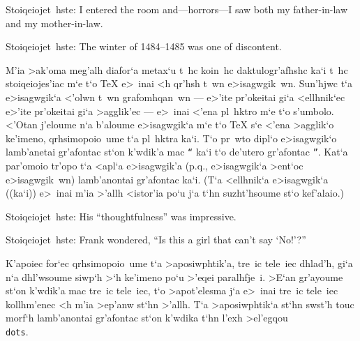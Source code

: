 
\exercise Stoiqeiojet~hste: {\rm I entered the room and---horrors---I
saw both my father-in-law and my mother-in-law. }

\exercise Stoiqeiojet~hste: {\rm The winter of 1484--1485 was one of
discontent. }
\bigskip

M'ia >ak'oma meg'alh diafor`a metax`u t~hc koin~hc daktulogr'afhshc ka`i
t~hc stoiqeiojes'iac m`e t`o {\rm \TeX} e>~inai <h qr'hsh t~wn
e>isa\-gw\-gik~wn.  Sun'hjwc t`a e>isagwgik`a <'olwn t~wn
grafo\-mh\-qa\-n~wn --- e>'ite pr'okeitai gi`a <ellhnik`ec e>'ite
pr'okeitai gi`a >agglik'ec --- e>~inai <'ena pl~hktro m`e t`o
s'umbolo\null.  <'Otan j'eloume n`a b'aloume e>isagwgik`a m`e
t`o {\rm \TeX} s`e <'ena >agglik`o ke'imeno, qrhsimopoio~ume t`a
pl~h\-ktra  ka`i\null.
T`o pr~wto dipl`o e>isagwgik`o lamb'anetai gr'afontac st`on k'wdik'a mac
{\tt ``} ka`i t`o de'utero gr'afontac {\tt ''}\null. Kat`a par'omoio   
tr'opo t`a <apl`a e>isagwgik'a (p.q., e>isagwgik`a >ent`oc
e>isa\-gw\-gi\-k~wn) lamb'anontai gr'a\-fontac ka`i\null.  (T`a <ellhnik`a e>isa\-gwgi\-k`a ((\NB ka`i\NB)) e>~inai m'ia
>'allh <istor'ia po`u j`a t`hn suzht'hsoume st`o kef'alaio.)

\exercise Stoiqeiojet~hste: {\rm His ``thoughtfulness'' was impressive. }

\exercise Stoiqeiojet~hste: {\rm Frank wondered, ``Is this a girl that
can't say `No!'?'' }
\bigskip

K'apoiec for`ec qrhsimopoio~ume t`a >aposiwphtik'a, tre~ic tele~iec     
dhlad'h, gi`a n`a dhl'wsoume siwp`h >`h ke'imeno po`u   >'eqei
paralhfje~i. >E`an gr'ayoume st`on k'wdik'a mac tre~ic tele~iec, t`o
>apot'elesma j`a e>~inai tre~ic tele~iec kollhm'enec <h m'ia >ep'anw
st`hn >'allh.  T`a >aposiwphtik`a st`hn swst'h touc morf`h lamb'anontai
gr'afontac st`on k'wdika t`hn l'exh >el'egqou {\tt \\dots}.%

